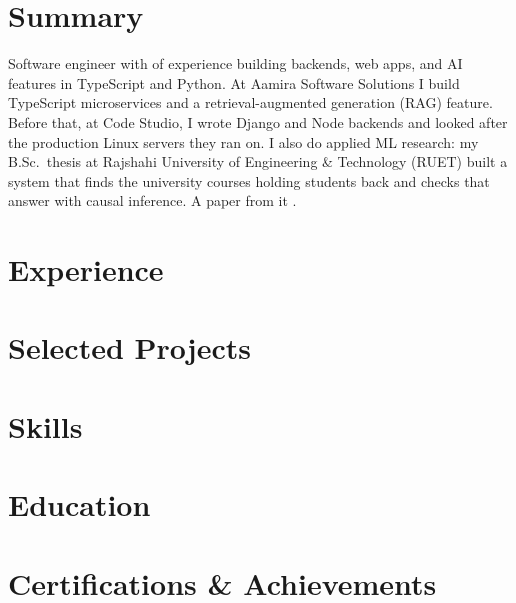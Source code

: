 \documentclass[10pt, a4paper]{article}
\begin{document}
\color{primary}
\cvheader

\section{Summary}
Software engineer with \factExpYears{} of experience building backends, web apps, and AI features in TypeScript and Python. At Aamira Software Solutions I build TypeScript microservices and a retrieval-augmented generation (RAG) feature. Before that, at Code Studio, I wrote Django and Node backends and looked after the production Linux servers they ran on. I also do applied ML research: my B.Sc.\ thesis at Rajshahi University of Engineering \& Technology (RUET) built a system that finds the university courses holding students back and checks that answer with causal inference. A paper from it \factLakIs{}.

\section{Experience}





\section{Selected Projects}



\section{Skills}


\section{Education}
\def\eduthesisline{}


\section{Certifications \& Achievements}
\def\certindustry{}

\end{document}
